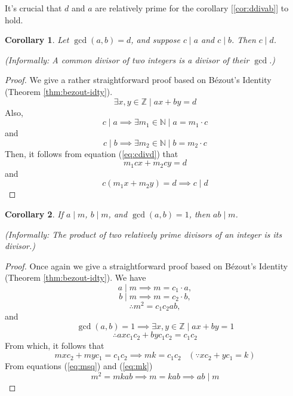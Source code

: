 \documentclass[english,notitlepage,smartquotes]{hgbreport}
\theoremstyle{definition}
\theoremstyle{remark}
\theoremstyle{plain}
\newtheorem{corollary}{Corollary}[theorem]
\begin{document}
It's crucial that $d$ and $a$ are relatively prime for the corollary [\ref{cor:ddivab}] to hold.
\begin{corollary}
\label{cor:cdivd}
Let $\gcd(a,b)=d$, and suppose $c\mid a$ and $c\mid b$. Then $c\mid d$.

(Informally: A common divisor of two integers is a divisor of their $\gcd$.)
\end{corollary}
\begin{proof}
We give a rather straightforward proof based on B\'ezout's Identity (Theorem \ref{thm:bezout-idty}).
\begin{equation}
\label{eq:cdivd}
\exists x,y\in\mathbb{Z}\mid ax+by=d
\end{equation}
Also,
$$
c\mid a\implies \exists m_1\in\mathbb{N}\mid a=m_1\cdot c
$$
and
$$
c\mid b\implies \exists m_2\in\mathbb{N}\mid b=m_2\cdot c
$$
Then, it follows from equation (\ref{eq:cdivd}) that
$$
m_1cx+m_2cy=d
$$
and
$$
c(m_1x+m_2y)=d\implies c\mid d
$$

\end{proof}
\begin{corollary}
\label{cor:abdivm}
If $a\mid m$, $b\mid m$, and $\gcd(a,b)=1$, then $ab\mid m$.

(Informally: The product of two relatively prime divisors of an integer is its divisor.)
\end{corollary}
\begin{proof}
Once again we give a straightforward proof based on B\'ezout's Identity (Theorem \ref{thm:bezout-idty}).
We have
$$
a\mid m\implies m=c_1\cdot a,
$$
$$
b\mid m\implies m=c_2\cdot b,
$$
\begin{equation}
\label{eq:msq}
\therefore m^2=c_1c_2ab,
\end{equation}
and
$$
\gcd(a,b)=1\implies \exists x,y\in\mathbb{Z}\mid ax+by=1
$$
$$
\therefore axc_1c_2+byc_1c_2=c_1c_2
$$
From which, it follows that
\begin{equation}
\label{eq:mk}
mxc_2+myc_1=c_1c_2\implies mk=c_1c_2 \;\;\;(\because xc_2+yc_1=k)
\end{equation}
From equations (\ref{eq:msq}) and (\ref{eq:mk})
$$
m^2=mkab\implies m=kab\implies ab\mid m
$$
\end{proof}
\end{document}
